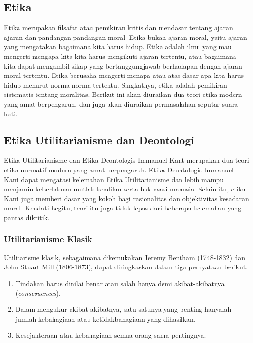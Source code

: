\documentclass[10pt,a4paper]{article}
\renewenvironment{quote}
{\list{}{%
       \leftmargin 1.5em 
       \rightmargin 0em}
   \item\relax}
{\endlist}
\def\tightlist{}
\begin{document}
\begin{multicols}{2}
\hypertarget{etika}{%
\section{Etika}\label{etika}}

Etika merupakan filsafat atau pemikiran kritis dan mendasar tentang
ajaran ajaran dan pandangan-pandangan moral. Etika bukan ajaran moral,
yaitu ajaran yang mengatakan bagaimana kita harus hidup. Etika adalah
ilmu yang mau mengerti mengapa kita kita harus mengikuti ajaran
tertentu, atau bagaimana kita dapat mengambil sikap yang
bertanggungjawab berhadapan dengan ajaran moral tertentu. Etika berusaha
mengerti menapa atau atas dasar apa kita harus hidup menurut norma-norma
tertentu. Singkatnya, etika adalah pemikiran sistematis tentang
moralitas. Berikut ini akan diuraikan dua teori etika modern yang amat
berpengaruh, dan juga akan diuraikan permasalahan seputar suara hati.

\hypertarget{etika-utilitarianisme-dan-deontologi}{%
\subsection{Etika Utilitarianisme dan
Deontologi}\label{etika-utilitarianisme-dan-deontologi}}

\begin{quote}
Etika Utilitarianisme dan Etika Deontologis Immanuel Kant merupakan dua
teori etika normatif modern yang amat berpengaruh. Etika Deontologis
Immanuel Kant dapat mengatasi kelemahan Etika Utilitarianisme dan lebih
mampu menjamin keberlakuan mutlak keadilan serta hak asasi manusia.
Selain itu, etika Kant juga memberi dasar yang kokoh bagi rasionalitas
dan objektivitas kesadaran moral. Kendati begitu, teori itu juga tidak
lepas dari beberapa kelemahan yang pantas dikritik.
\end{quote}

\hypertarget{utilitarianisme-klasik}{%
\subsubsection{Utilitarianisme Klasik}\label{utilitarianisme-klasik}}

Utilitarisme klasik, sebagaimana dikemukakan Jeremy Bentham (1748-1832)
dan John Stuart Mill (1806-1873), dapat diringkaskan dalam tiga
pernyataan berikut.

\begin{enumerate}
\def\labelenumi{\arabic{enumi}.}
\tightlist
\item
  Tindakan harus dinilai benar atau salah hanya demi akibat-akibatnya
  (\emph{consequences}).
\item
  Dalam mengukur akibat-akibatnya, satu-satunya yang penting hanyalah
  jumlah kebahagiaan atau ketidakbahagiaan yang dihasilkan.
\item
  Kesejahteraan atau kebahagiaan semua orang sama pentingnya.
\end{enumerate}


\end{multicols}
\end{document}
